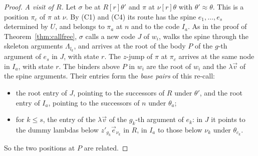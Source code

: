 \documentclass[11pt]{article}
\theoremstyle{plain}
\theoremstyle{definition}
\theoremstyle{remark}
\begin{document}
\begin{proof}
\emph{A visit of $R$.}  Let $\sigma$ be at $R[r]\theta'$ and $\pi$ at
$\nu[r]\theta$ with $\theta'\approx\theta$.  This is a position $\pi_c$
of $\pi$ at $\nu$.  By (C1) and (C4) its route has the spine
$e_1,\dots,e_s$ determined by $U$, and belongs to $\pi_a$ at $n$ and to
the code $I_a$.  As in the proof of Theorem~\ref{thm:callfree}, $\sigma$
calls a new code $J$ of $w_i$, walks the spine through the skeleton
arguments $\Lambda_{l_k}$, and arrives at the root of the body $P$ of the
$g$-th argument of $e_s$ in $J$, with state $r$.  The $z$-jump of $\pi$ at
$\pi_c$ arrives at the same node in $I_a$, with state $r$.  The binders
above $P$ in $w_i$ are the root of $w_i$ and the $\lambda\vec v$ of the
spine arguments.  Their entries form the \emph{base pairs} of this
re-call:
\begin{itemize}
\item[(B$_0$)] the root entry of $J$, pointing to the successors of $R$
  under $\theta'$, and the root entry of $I_a$, pointing to the
  successors of $n$ under $\theta_a$;
\item[(B$_k$)] for $k\le s$, the entry of the $\lambda\vec v$ of the
  $g_k$-th argument of $e_k$: in $J$ it points to the dummy lambdas
  below $z'_{g_k}\vec e_{\nu_k}$ in $R$, in $I_a$ to those below $\nu_k$
  under $\theta_{c_k}$.
\end{itemize}
So the two positions at $P$ are related.


\end{proof}
\end{document}
